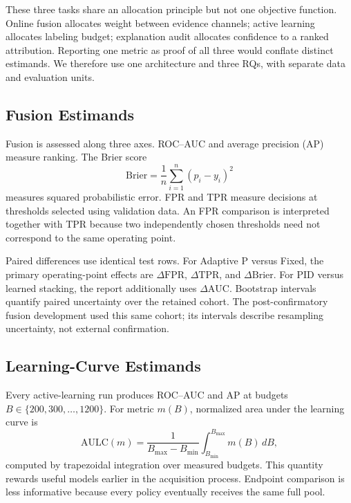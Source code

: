 These three tasks share an allocation principle but not one objective function.
Online fusion allocates weight between evidence channels; active learning
allocates labeling budget; explanation audit allocates confidence to a ranked
attribution. Reporting one metric as proof of all three would conflate distinct
estimands. We therefore use one architecture and three RQs, with separate data
and evaluation units.

\subsection{Fusion Estimands}

Fusion is assessed along three axes. ROC--AUC and average precision (AP) measure
ranking. The Brier score
\begin{equation}
\mathrm{Brier}=\frac{1}{n}\sum_{i=1}^{n}(p_i-y_i)^2
\label{eq:brier}
\end{equation}
measures squared probabilistic error. FPR and TPR measure decisions at thresholds
selected using validation data. An FPR comparison is interpreted together with
TPR because two independently chosen thresholds need not correspond to the same
operating point.

Paired differences use identical test rows. For Adaptive P versus Fixed, the
primary operating-point effects are
$\Delta\mathrm{FPR}$, $\Delta\mathrm{TPR}$, and
$\Delta\mathrm{Brier}$. For PID versus learned stacking, the report additionally
uses $\Delta\mathrm{AUC}$. Bootstrap intervals quantify paired uncertainty over
the retained cohort. The post-confirmatory fusion development used this same
cohort; its intervals describe resampling uncertainty, not external
confirmation.

\subsection{Learning-Curve Estimands}

Every active-learning run produces ROC--AUC and AP at budgets
$B\in\{200,300,\ldots,1200\}$. For metric $m(B)$, normalized area under the
learning curve is
\begin{equation}
\mathrm{AULC}(m)=\frac{1}{B_{\max}-B_{\min}}
\int_{B_{\min}}^{B_{\max}}m(B)\,dB,
\label{eq:aulc}
\end{equation}
computed by trapezoidal integration over measured budgets. This quantity rewards
useful models earlier in the acquisition process. Endpoint comparison is less
informative because every policy eventually receives the same full pool.

